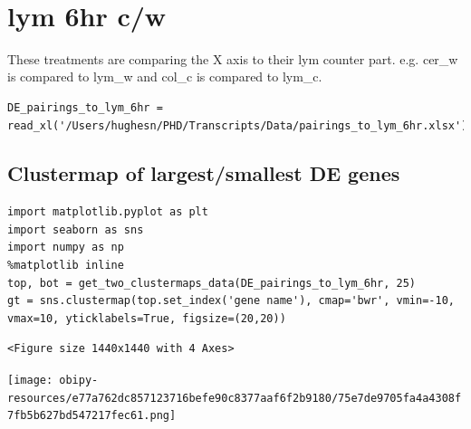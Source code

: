 \documentclass[11pt]{article}
\begin{document}
\clearpage\\
\section{lym 6hr c/w}
\label{sec:orgae661e2}

These treatments are comparing the X axis to their lym counter part. e.g. cer\_w is compared to lym\_w and col\_c is compared to lym\_c.\\
\begin{verbatim}
DE_pairings_to_lym_6hr = read_xl('/Users/hughesn/PHD/Transcripts/Data/pairings_to_lym_6hr.xlsx')
\end{verbatim}


\subsection{Clustermap of largest/smallest DE genes}
\label{sec:orgab5ca0e}

\begin{verbatim}
import matplotlib.pyplot as plt
import seaborn as sns
import numpy as np
%matplotlib inline
top, bot = get_two_clustermaps_data(DE_pairings_to_lym_6hr, 25)
gt = sns.clustermap(top.set_index('gene name'), cmap='bwr', vmin=-10, vmax=10, yticklabels=True, figsize=(20,20))
\end{verbatim}

\begin{verbatim}
<Figure size 1440x1440 with 4 Axes>
\end{verbatim}


\begin{center}
\texttt{[image: obipy-resources/e77a762dc857123716befe90c8377aaf6f2b9180/75e7de9705fa4a4308f7fb5b627bd547217fec61.png]}
\end{center}
\end{document}
